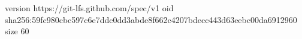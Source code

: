 version https://git-lfs.github.com/spec/v1
oid sha256:59fc980cbc597c6e7ddc0dd3abde8f662c4207bdecc443d63eebc00da6912960
size 60
